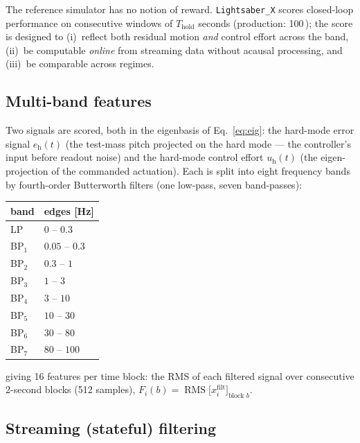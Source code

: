 \documentclass[11pt,a4paper]{article}
\newcommand{\SI}[2]{#1\,\text{#2}}
\newcommand{\code}[1]{\texttt{#1}}
\newcommand{\Thold}{T_{\mathrm{hold}}}
\begin{document}
The reference simulator has no notion of reward. \code{Lightsaber\_X} scores closed-loop
performance on consecutive windows of $\Thold$ seconds (production: \SI{100}{s}); the
score is designed to (i)~reflect both residual motion \emph{and} control effort across
the band, (ii)~be computable \emph{online} from streaming data without acausal
processing, and (iii)~be comparable across regimes.

\subsection{Multi-band features}

Two signals are scored, both in the eigenbasis of Eq.~\eqref{eq:eig}: the hard-mode
error signal $e_{\mathrm h}(t)$ (the test-mass pitch projected on the hard mode --- the
controller's input before readout noise) and the hard-mode control effort
$u_{\mathrm h}(t)$ (the eigen-projection of the commanded actuation). Each is split into
eight frequency bands by fourth-order Butterworth filters (one low-pass, seven
band-passes):
\begin{center}
\begin{tabular}{ll}
\toprule
band & edges [Hz]\\
\midrule
LP        & $0$ -- $0.3$\\
BP$_1$    & $0.05$ -- $0.3$\\
BP$_2$    & $0.3$ -- $1$\\
BP$_3$    & $1$ -- $3$\\
BP$_4$    & $3$ -- $10$\\
BP$_5$    & $10$ -- $30$\\
BP$_6$    & $30$ -- $80$\\
BP$_7$    & $80$ -- $100$\\
\bottomrule
\end{tabular}
\end{center}
giving 16 features per time block: the RMS of each filtered signal over consecutive
2-second blocks (512 samples),
$F_i(b) = \operatorname{RMS}\big[x_i^{\mathrm{filt}}\big]_{\text{block } b}$.

\subsection{Streaming (stateful) filtering}
\label{sec:stream}
\end{document}
